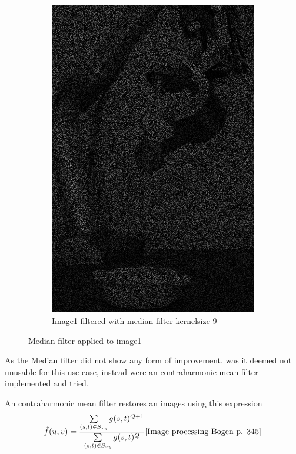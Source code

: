 \begin{figure}[H]
\begin{subfigure}[b]{0.27\textwidth}
        \includegraphics[width=\textwidth]{img1/img_1_medianBlur_9.png}
        \caption{Image1 filtered with median filter kernelsize 9}
        \label{fig:img1_median9}
    \end{subfigure}
    \caption{Median filter applied to image1}\label{fig:img_median_full}
\end{figure}

As the Median filter did not show  any form of improvement, was it  deemed not unusable for this use case, instead were an contraharmonic mean filter implemented and tried.  

An contraharmonic mean filter restores an images using this expression
\begin{equation}
\hat{f}(u,v) = \frac{\sum\limits_{(s,t) \in S_{xy}}g(s,t)^{Q+1}}{\sum\limits_{(s,t) \in S_{xy}}g(s,t)^{Q}}
\cite{Image processing Bogen p. 345}
\label{eq:Contra}
\end{equation}

